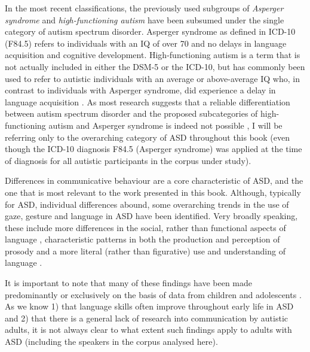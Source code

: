 In the most recent classifications, the previously used subgroups of \emph{Asperger syndrome} and \emph{high-functioning autism} have been subsumed under the single category of autism spectrum disorder. Asperger syndrome as defined in ICD-10 (F84.5) refers to individuals with an IQ of over 70 and no delays in language acquisition and cognitive development. High-functioning autism is a term that is not actually included in either the DSM-5 or the ICD-10, but has commonly been used to refer to autistic individuals with an average or above-average IQ who, in contrast to individuals with Asperger syndrome, did experience a delay in language acquisition \citep[see][Chapter 4]{krugerProsodicDecodingEncoding2018}. As most research suggests that a reliable differentiation between autism spectrum disorder and the proposed subcategories of high-functioning autism and Asperger syndrome is indeed not possible \citep{frazierValidationProposedDSM52012, lordMultisiteStudyClinical2012}, I will be referring only to the overarching category of ASD throughout this book (even though the ICD-10 diagnosis F84.5 (Asperger syndrome) was applied at the time of diagnosis for all autistic participants in the corpus under study). 

Differences in communicative behaviour are a core characteristic of ASD, and the one that is most relevant to the work presented in this book. Although, typically for ASD, individual differences abound, some overarching trends in the use of gaze, gesture and language in ASD have been identified. Very broadly speaking, these include more differences in the social, rather than functional aspects of language \citep[see][]{krugerProsodicDecodingEncoding2018}, characteristic patterns in both the production and perception of prosody \citep[e.g.][]{mccannProsodyAutismSpectrum2003a, paulPerceptionProductionProsody2005, griceLinguisticProsodyAutism2023} and a more literal (rather than figurative) use and understanding of language \citep[e.g.][]{happeUnderstandingMindsMetaphors1995}.

It is important to note that many of these findings have been made predominantly or exclusively on the basis of data from children and adolescents \citep[see][]{krugerProsodicDecodingEncoding2018, griceLinguisticProsodyAutism2023}. As we know 1) that language skills often improve throughout early life in ASD \citep{gernsbacherLanguageSpeechAutism2016} and 2) that there is a general lack of research into communication by autistic adults, it is not always clear to what extent such findings apply to adults with ASD (including the speakers in the corpus analysed here).

